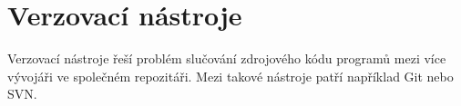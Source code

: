 \section{Verzovací nástroje}

Verzovací nástroje řeší problém slučování zdrojového kódu programů mezi více vývojáři ve společném repozitáři.
Mezi takové nástroje patří například Git nebo SVN.

